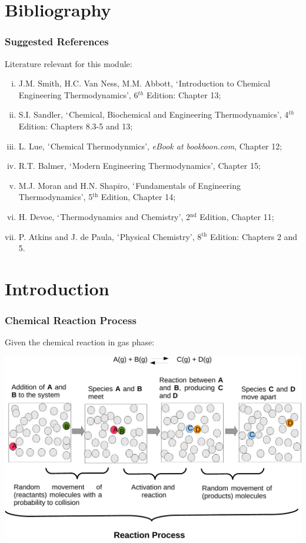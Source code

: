 \documentclass[10pt,compress,handout,unknownkeysallowed]{beamer}
\begin{document}
\section{Bibliography}
\begin{frame}
 \frametitle{Suggested References}
  Literature relevant for this module:
  \begin{enumerate}[(i)]
     \item\label{SVN_Book} J.M. Smith, H.C. Van Ness, M.M. Abbott, $\lq$Introduction to Chemical Engineering Thermodynamics', 6$^{th}$ Edition: Chapter 13;
     \item\label{Sandle_Book} S.I. Sandler, $\lq$Chemical, Biochemical and Engineering Thermodynamics', 4$^{th}$ Edition: Chapters 8.3-5 and 13;
     \item\label{Lue_Book} L. Lue, $\lq$Chemical Thermodynmics', {\it eBook at bookboon.com}, Chapter 12;
     \item\label{Balmer_Book}R.T. Balmer, $\lq$Modern Engineering Thermodynamics', Chapter 15;
     \item\label{Moran_Book} M.J. Moran and H.N. Shapiro, $\lq$Fundamentals of Engineering Thermodynamics', 5$^{\text{th}}$ Edition, Chapter 14;
     \item\label{Devoe_Book} H. Devoe, $\lq$Thermodynamics and Chemistry', 2$^{\text{nd}}$ Edition, Chapter 11;
     \item\label{Atkins_Book} P. Atkins and J. de Paula, $\lq$Physical Chemistry', 8$^{\text{th}}$ Edition: Chapters 2 and 5.
  \end{enumerate}
\end{frame}


\section{Introduction}

\begin{frame}
  \frametitle{Chemical Reaction Process}
      Given the chemical reaction in gas phase:

          \vspace{-.0cm}
          \includegraphics[width=.95\columnwidth,clip]{./../Pics/ChemicalReactionsDiagram2}
\end{frame}
\normalsize
\end{document}
